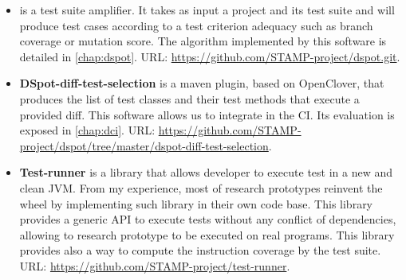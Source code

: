 \begin{itemize}
	\item[ ] \textbf{\dspot} is a test suite amplifier. 
	It takes as input a project and its test suite and will produce test cases according to a test criterion adequacy such as branch coverage or mutation score. The algorithm implemented by this software is detailed in \autoref{chap:dspot}.
	URL:  \url{https://github.com/STAMP-project/dspot.git}.
	\item[ ] \textbf{DSpot-diff-test-selection} is a maven plugin, based on OpenClover, that produces the list of test classes and their test methods that execute a provided diff. This software allows us to integrate \dspot in the CI. Its evaluation is exposed in \autoref{chap:dci}.
	URL: \url{https://github.com/STAMP-project/dspot/tree/master/dspot-diff-test-selection}.
	\item [ ] \textbf{Test-runner} is a library that allows developer to execute test in a new and clean JVM.
	From my experience, most of research prototypes reinvent the wheel by implementing such library in their own code base.
	This library provides a generic API to execute tests without any conflict of dependencies, allowing to research prototype to be executed on real programs.
	This library provides also a way to compute the instruction coverage by the test suite.
	URL: \url{https://github.com/STAMP-project/test-runner}.
\end{itemize}